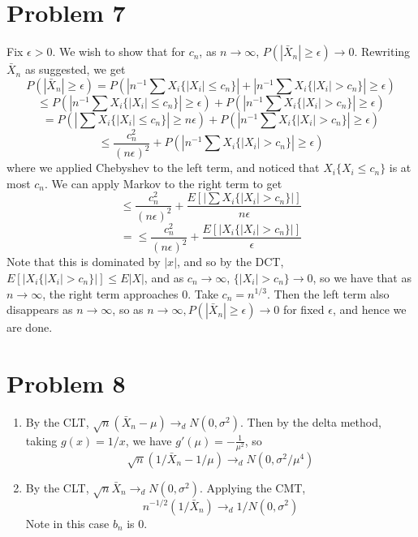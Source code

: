 \documentclass[10pt,letter]{article}
\begin{document}
\section*{Problem 7}
Fix $\epsilon > 0$. We wish to show that for $c_n$, as $n\to\infty$, $P(|\bar{X}_n| \ge \epsilon) \to 0$. Rewriting $\bar{X}_n$ as suggested, we get
\[ P(|\bar{X}_n| \ge \epsilon) = P\left(\left|n^{-1} \sum X_i \{ |X_i| \le c_n \}\right| + \left|n^{-1} \sum X_i \{ |X_i| > c_n \} \right| \ge \epsilon\right) \]
\[ \le P\left(\left|n^{-1} \sum X_i \{ |X_i| \le c_n \}\right|\ge \epsilon\right) + P\left(\left|n^{-1} \sum X_i \{ |X_i| > c_n \} \right| \ge \epsilon\right) \]
\[ = P\left(\left| \sum X_i \{ |X_i| \le c_n \}\right| \ge n\epsilon\right) + P\left(\left|n^{-1} \sum X_i \{ |X_i| > c_n \} \right| \ge \epsilon\right) \]
\[ \le \frac{c_n^2}{(n\epsilon)^2} + P\left(\left|n^{-1} \sum X_i \{ |X_i| > c_n \} \right| \ge \epsilon\right) \]
where we applied Chebyshev to the left term, and noticed that $X_i\{X_i \le c_n \}$ is at most $c_n$. We can apply Markov to the right term to get
\[ \le \frac{c_n^2}{(n\epsilon)^2} + \frac{E\left[ \left| \sum X_i \{ |X_i| > c_n \}\right|\right]}{n\epsilon} \]
\[ = \le \frac{c_n^2}{(n\epsilon)^2} + \frac{E\left[ \left| X_i \{ |X_i| > c_n \}\right|\right]}{\epsilon} \]
Note that this is dominated by $|x|$, and so by the DCT, $E\left[ \left| X_i \{ |X_i| > c_n \}\right|\right] \le E|X|$, and as $c_n \to \infty$, $\{ |X_i| > c_n \} \to 0$, so we have that as $n \to \infty$, the right term approaches 0. Take $c_n = n^{1/3}$. Then the left term also disappears as $n \to \infty$, so as $n \to \infty, P(|\bar{X}_n| \ge \epsilon) \to 0$ for fixed $\epsilon$, and hence we are done.
\section*{Problem 8}
\begin{enumerate}[label=(\alph*)]
\item By the CLT, $\sqrt{n} (\bar{X}_n - \mu) \to_d N(0, \sigma^2)$. Then by the delta method, taking $g(x) = 1/x$, we have $g'(\mu) = -\frac{1}{\mu^2}$, so
\[ \sqrt{n} (1/\bar{X}_n - 1/\mu) \to_d N(0, \sigma^2/\mu^4) \]
\item By the CLT, $\sqrt{n} \bar{X}_n \to_d N(0, \sigma^2)$. Applying the CMT,
\[ n^{-1/2}(1/\bar{X}_n) \to_d 1/N(0,\sigma^2) \]
Note in this case $b_n$ is 0.
\end{enumerate}
\end{document}
